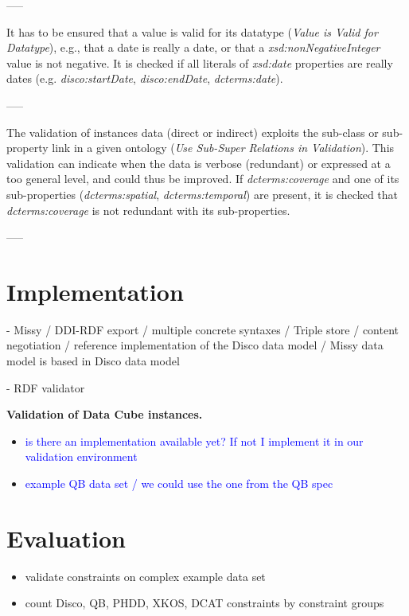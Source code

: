\documentclass{llncs}
\begin{document}
-----

It has to be ensured that a value is valid for its datatype (\emph{Value is Valid for Datatype}), e.g., 
that a date is really a date, or that a \emph{xsd:nonNegativeInteger} value is not negative. 
It is checked if all literals of {\em xsd:date} properties are really dates (e.g. {\em disco:startDate}, {\em disco:endDate}, {\em dcterms:date}).

-----

The validation of instances data (direct or indirect) exploits the sub-class or sub-property link in a given ontology (\emph{Use Sub-Super Relations in Validation}).
This validation can indicate when the data is verbose (redundant) or expressed at a too general level, and could thus be improved.
If \emph{dcterms:coverage} and one of its sub-properties (\emph{dcterms:spatial}, \emph{dcterms:temporal}) are present,
it is checked that \emph{dcterms:coverage} is not redundant with its sub-properties. 

-----

\section{Implementation}

- Missy / DDI-RDF export / multiple concrete syntaxes / Triple store / content negotiation / reference implementation of the Disco data model / Missy data model is based in Disco data model

- RDF validator

\textbf{Validation of Data Cube instances.}
\begin{itemize}
	\item \textcolor{blue}{is there an implementation available yet? If not I implement it in our validation environment}
	\item \textcolor{blue}{example QB data set / we could use the one from the QB spec}
\end{itemize}

\section{Evaluation}

\begin{itemize}
	\item validate constraints on complex example data set
	\item count Disco, QB, PHDD, XKOS, DCAT constraints by constraint groups 
\end{itemize}
\end{document}

